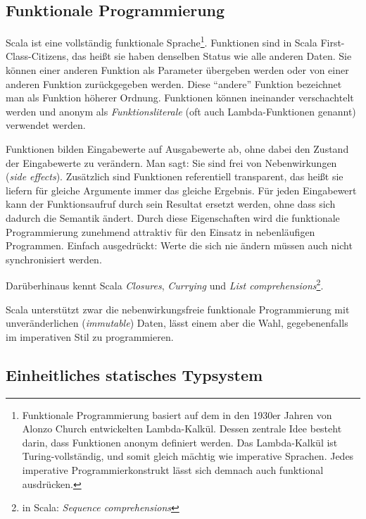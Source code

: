 \documentclass[a4paper, 12pt, hidelinks, listof=totoc, listoftables=totoc, bibliography=totoc]{scrreprt}
\begin{document}
\subsection{Funktionale Programmierung}


Scala ist eine vollständig funktionale Sprache\footnote{Funktionale Programmierung basiert auf dem in den 1930er Jahren von Alonzo Church entwickelten Lambda-Kalkül. Dessen zentrale Idee besteht darin, dass Funktionen anonym definiert werden. Das Lambda-Kalkül ist Turing-vollständig, und somit gleich mächtig wie imperative Sprachen. Jedes imperative Programmierkonstrukt lässt sich demnach auch funktional ausdrücken.}. Funktionen sind in Scala First-Class-Citizens, das heißt sie haben denselben Status wie alle anderen Daten. Sie können einer anderen Funktion als Parameter übergeben werden oder von einer anderen Funktion zurückgegeben werden. Diese "`andere"' Funktion bezeichnet man als Funktion höherer Ordnung. Funktionen können ineinander verschachtelt werden und anonym als \emph{Funktionsliterale} (oft auch Lambda-Funktionen genannt) verwendet werden.

Funktionen bilden Eingabewerte auf Ausgabewerte ab, ohne dabei den Zustand der Eingabewerte zu verändern. Man sagt: Sie sind frei von Nebenwirkungen (\emph{side effects}). Zusätzlich sind Funktionen referentiell transparent, das heißt sie liefern für gleiche Argumente immer das gleiche Ergebnis. Für jeden Eingabewert kann der Funktionsaufruf durch sein Resultat ersetzt werden, ohne dass sich dadurch die Semantik ändert. Durch diese Eigenschaften wird die funktionale Programmierung zunehmend attraktiv für den Einsatz in nebenläufigen Programmen. Einfach ausgedrückt: Werte die sich nie ändern müssen auch nicht synchronisiert werden.

Darüberhinaus kennt Scala \emph{Closures}, \emph{Currying} und \emph{List comprehensions}\footnote{in Scala: \emph{Sequence comprehensions}}.

Scala unterstützt zwar die nebenwirkungsfreie funktionale Programmierung mit unveränderlichen (\emph{immutable}) Daten, lässt einem aber die Wahl, gegebenenfalls im imperativen Stil zu programmieren.\cite[S. 6 ff.]{piepmeyer2010.GFP}\cite[S. 10 ff.]{odersky2008.PIS}

\subsection{Einheitliches statisches Typsystem}\label{subsec:scala-types}
\end{document}
